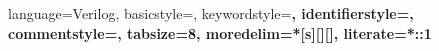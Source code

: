 
{
    language=Verilog,
    basicstyle=\small\sffamily,
    keywordstyle=\bfseries\color{MidnightBlue},
    identifierstyle=\color{black},
    commentstyle=\color{cmmtcolor},
    tabsize=8,
    moredelim=*[s][]{[}{]},
    literate=*{:}{:}1
}

\makeatletter
\newcommand*\@lbracket{[}
\newcommand*\@rbracket{]}
\newcommand*\@colon{:}
\newcommand*\colorIndex{%
   \edef\@temp{\the\lst@token}%
        \ifx\@temp\@lbracket \color{black}%
            \else\ifx\@temp\@rbracket \color{black}%
                \else\ifx\@temp\@colon \color{black}%
                    \else \color{vorange}%
                        \fi\fi\fi
                        }
\makeatother
                        
